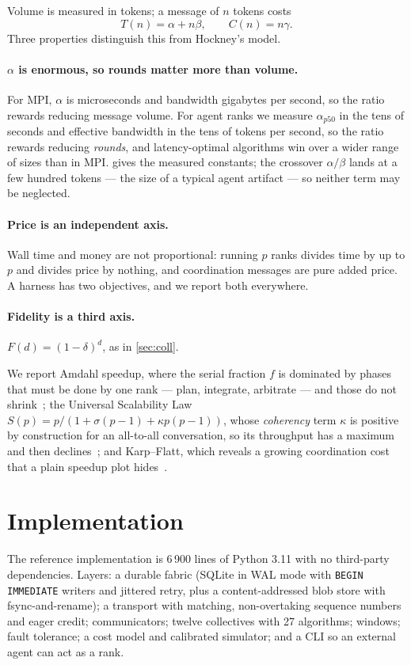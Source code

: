 \documentclass[10pt,twocolumn]{article}
\theoremstyle{definition}
\theoremstyle{plain}
\newcommand{\code}[1]{\texttt{\small #1}}
\begin{document}
Volume is measured in tokens; a message of $n$ tokens costs
\[ T(n)=\alpha+n\beta, \qquad C(n)=n\gamma . \]
Three properties distinguish this from Hockney's model.

\paragraph{$\alpha$ is enormous, so rounds matter more than volume.} For MPI,
$\alpha$ is microseconds and bandwidth gigabytes per second, so the ratio rewards
reducing message volume. For agent ranks we measure $\alpha_{p50}$ in the tens of
seconds and effective bandwidth in the tens of tokens per second, so the ratio
rewards reducing \emph{rounds}, and latency-optimal algorithms win over a wider
range of sizes than in MPI.  gives the measured constants;
the crossover $\alpha/\beta$ lands at a few hundred tokens --- the size of a typical
agent artifact --- so neither term may be neglected.

\paragraph{Price is an independent axis.} Wall time and money are not proportional:
running $p$ ranks divides time by up to $p$ and divides price by nothing, and
coordination messages are pure added price. A harness has two objectives, and we
report both everywhere.

\paragraph{Fidelity is a third axis.} $F(d)=(1-\delta)^d$, as in \cref{sec:coll}.

We report Amdahl speedup, where the serial fraction $f$ is dominated by phases that
must be done by one rank --- plan, integrate, arbitrate --- and those do not
shrink~\cite{amdahl67}; the Universal Scalability Law
$S(p)=p/(1+\sigma(p-1)+\kappa p(p-1))$, whose \emph{coherency} term $\kappa$ is
positive by construction for an all-to-all conversation, so its throughput has a
maximum and then declines~\cite{gunther07usl}; and Karp--Flatt, which reveals a
growing coordination cost that a plain speedup plot hides~\cite{karp90metric}.

\section{Implementation}
\label{sec:impl}

The reference implementation is 6\,900 lines of Python 3.11 with no third-party
dependencies. Layers: a durable fabric (SQLite in WAL mode with
\code{BEGIN IMMEDIATE} writers and jittered retry, plus a content-addressed blob
store with fsync-and-rename); a transport with matching, non-overtaking sequence
numbers and eager credit; communicators; twelve collectives with 27 algorithms;
windows; fault tolerance; a cost model and calibrated simulator; and a CLI so an
external agent can act as a rank.
\end{document}
